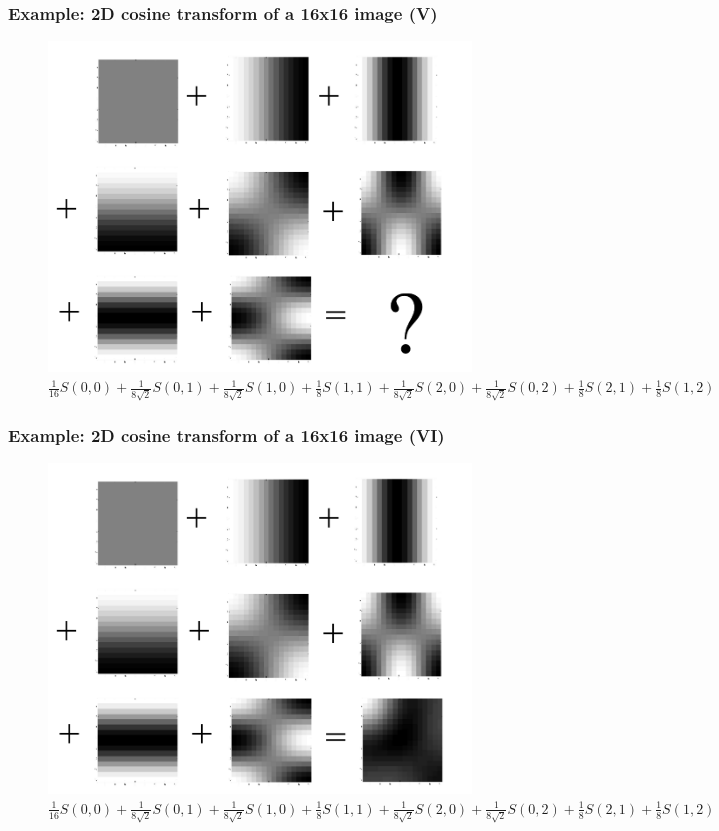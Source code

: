 \documentclass{beamer}
\begin{document}
\begin{frame}
\frametitle{Example: 2D cosine transform of a 16x16 image (V)}
\begin{figure}[H]
  \includegraphics[width=  0.7 \textwidth]{Ex_BasisImages5} 
  \caption{$\frac{1}{16}S(0,0) + \frac{1}{8\sqrt{2}}S(0,1) + \frac{1}{8\sqrt{2}}S(1,0) + \frac{1}{8}S(1,1) + \frac{1}{8\sqrt{2}}S(2,0) + \frac{1}{8\sqrt{2}}S(0,2) + \frac{1}{8}S(2,1) + \frac{1}{8}S(1,2)$}
\end{figure} 
\end{frame}

\begin{frame}
\frametitle{Example: 2D cosine transform of a 16x16 image (VI)}
\begin{figure}[H]
  \includegraphics[width=  0.7 \textwidth]{Ex_BasisImages6} 
  \caption{$\frac{1}{16}S(0,0) + \frac{1}{8\sqrt{2}}S(0,1) + \frac{1}{8\sqrt{2}}S(1,0) + \frac{1}{8}S(1,1) + \frac{1}{8\sqrt{2}}S(2,0) + \frac{1}{8\sqrt{2}}S(0,2) + \frac{1}{8}S(2,1) + \frac{1}{8}S(1,2)$}
\end{figure} 
\end{frame}
\end{document}
